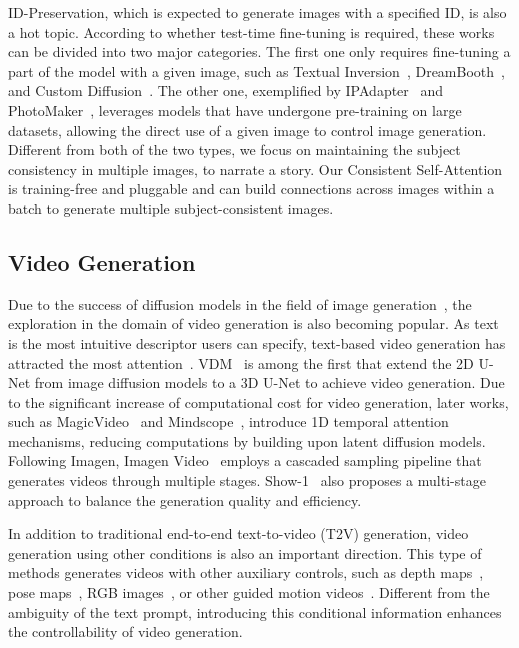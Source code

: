 \documentclass{article} %
\newcommand{\nameofsa}{Consistent Self-Attention}
\begin{document}
ID-Preservation, which is expected to generate images with a specified ID, is also a hot topic. %
%
According to whether test-time fine-tuning is required, these works can be divided into two major categories.
%
The first one only requires fine-tuning a part of the model with a given image, such as Textual Inversion~\citep{gal2022image}, DreamBooth~\citep{ruiz2023dreambooth}, and Custom Diffusion~\citep{kumari2023multi}.
%
The other one, exemplified by IPAdapter~\citep{ye2023ip} and PhotoMaker~\citep{li2023photomaker}, leverages models that have undergone pre-training on large datasets, allowing the direct use of a given image to control image generation.
Different from both of the two types, we focus on maintaining the subject consistency in multiple images, to narrate a story.
%
Our \nameofsa{} is training-free and pluggable and can build connections across images within a batch to generate multiple subject-consistent images.

\subsection{Video Generation}

Due to the success of diffusion models in the field of image generation~\citep{rombach2022high, ho2020denoising}, the exploration in the domain of video generation is also becoming popular.
%
As text is the most intuitive descriptor users can specify, text-based video generation has attracted the most attention~\citep{guo2023animatediff,jiang2023text2performer,singer2022make,wang2023lavie,yang2023probabilistic}.
%
VDM~\citep{ho2022video} is among the first that extend the 2D U-Net from image diffusion models to a 3D U-Net to achieve video generation.
%
Due to the significant increase of computational cost for video generation, later works, such as MagicVideo~\citep{zhou2023magicvideo} and Mindscope~\citep{wang2023modelscope}, introduce 1D temporal attention mechanisms, reducing computations by building upon latent diffusion models.
Following Imagen, Imagen Video~\citep{ho2022imagen} employs a cascaded sampling pipeline that generates videos through multiple stages.
Show-1~\citep{zhang2023show} also proposes a multi-stage approach to balance the generation quality and efficiency.
%


In addition to traditional end-to-end text-to-video (T2V) generation, 
video generation using other conditions is also an important direction.
%
This type of methods generates videos with other auxiliary controls, such as depth maps~\citep{guo2023sparsectrl,he2023animate}, pose maps~\citep{xu2023magicanimate,hu2023animate,wang2023disco,ma2023follow}, RGB images~\citep{blattmann2023stable,chen2023seine,ni2023conditional}, or other guided motion videos~\citep{zhao2023motiondirector,wu2023lamp}.  
%
Different from the ambiguity of the text prompt, introducing this conditional information enhances the controllability of video generation.
%
\end{document}
